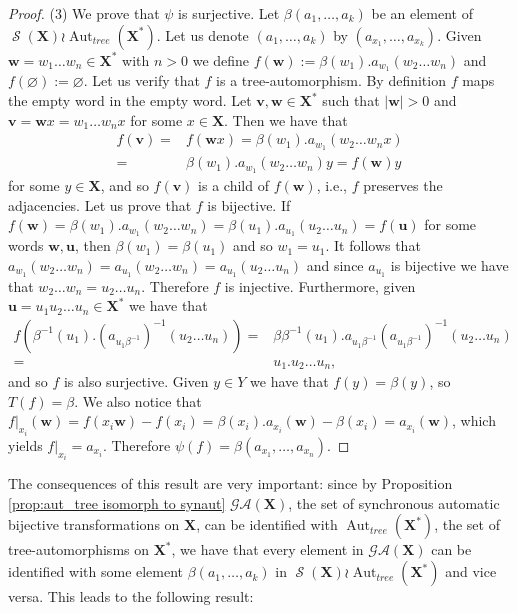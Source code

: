 \documentclass[mat1]{fmfdeloTS2.0}
\newcommand{\word}{\mathbf}				%
\newcommand{\abece}{\mathbf{X}}			%
\newcommand{\fslovar}{\mathbf{X^*}}		%
\newcommand{\synaut}{\mathcal{GA}}	%
\DeclareMathOperator{\aut}{\mathrm{Aut}}		%
\DeclareMathOperator{\symm}{\mathcal{S}}		%
\begin{document}
\begin{proof}
(3) We prove that $\psi$ is surjective. Let $\beta(a_1,\ldots,a_k)$ be an element of $\symm(\abece) \wr \aut_{tree}(\fslovar)$. Let us denote $(a_1,\ldots,a_k)$ by $(a_{x_1},\ldots,a_{x_k})$. Given $\word{w}=w_1\ldots w_n\in\fslovar$ with $n> 0$ we define $f(\word{w}):=\beta(w_1).a_{w_1}(w_2\ldots w_n)$ and $f(\varnothing):=\varnothing$. Let us verify that $f$ is a tree-automorphism. By definition $f$ maps the empty word in the empty word. Let $\word{v},\word{w}\in\fslovar$ such that $|\word{w}|>0$ and $\word{v}=\word{w}x=w_1\ldots w_n x$ for some $x\in\abece$. Then we have that 
\begin{align*}
f(\word{v})=&f(\word{w}x)=\beta(w_1).a_{w_1}(w_2\ldots w_n x)\\
=&\beta(w_1).a_{w_1}(w_2\ldots w_n)y=f(\word{w})y
\end{align*}
for some $y\in\abece$, and so $f(\word{v})$ is a child of $f(\word{w})$, i.e., $f$ preserves the adjacencies. Let us prove that $f$ is bijective. If $f(\word{w})=\beta(w_1).a_{w_1}(w_2\ldots w_n)=\beta(u_1).a_{u_1}(u_2\ldots u_n)=f(\word{u})$ for some words $\word{w},\word{u}$, then $\beta(w_1)=\beta(u_1)$ and so $w_1=u_1$. It follows that $a_{w_1}(w_2\ldots w_n)=a_{u_1}(w_2\ldots w_n)=a_{u_1}(u_2\ldots u_n)$ and since $a_{u_1}$ is bijective we have that $w_2\ldots w_n=u_2\ldots u_n$. Therefore $f$ is injective. Furthermore, given $\word{u}=u_1 u_2\ldots u_n\in\fslovar$ we have that
\begin{align*}
f(\beta^{-1}(u_1).(a_{u_1\beta^{-1}})^{-1}(u_2\ldots u_n))=&\beta\beta^{-1}(u_1).a_{u_1\beta^{-1}}(a_{u_1\beta^{-1}})^{-1}(u_2\ldots u_n)\\=&u_1.u_2\ldots u_n,
\end{align*}
and so $f$ is also surjective. Given $y\in Y$ we have that $f(y)=\beta(y)$, so $T(f)=\beta$. We also notice that $f|_{x_i}(\word{w})=f(x_i\word{w})-f(x_i)=\beta(x_i).a_{x_i}(\word{w})-\beta(x_i)=a_{x_i}(\word{w})$, which yields $f|_{x_i}=a_{x_i}$. Therefore $\psi(f)=\beta(a_{x_1},\ldots,a_{x_n})$.
\end{proof}

The consequences of this result are very important: since by Proposition \autoref{prop:aut_tree isomorph to synaut} $\synaut(\abece)$, the set of synchronous automatic bijective transformations on $\abece$, can be identified with $\aut_{tree}(\fslovar)$, the set of tree-automorphisms on $\fslovar$,  we have that every element in $\synaut(\abece)$ can be identified with some element $\beta(a_1,\ldots,a_k)$ in $\symm(\abece)\wr\aut_{tree}(\fslovar)$ and vice versa. This leads to the following result:
\end{document}
